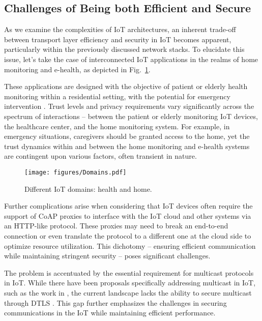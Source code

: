 \documentclass{ieeeaccess}
\begin{document}
\subsection{Challenges of Being both Efficient and Secure}

As we examine the complexities of IoT architectures, an inherent trade-off between transport layer efficiency and security in IoT becomes apparent, particularly within the previously discussed network stacks. To elucidate this issue, let's take the case of interconnected IoT applications in the realms of home monitoring and e-health, as depicted in Fig.~\ref{fig:domains}.

These applications are designed with the objective of patient or elderly health monitoring within a residential setting, with the potential for emergency intervention \cite{liu2016smart}. Trust levels and privacy requirements vary significantly across the spectrum of interactions -- between the patient or elderly monitoring IoT devices, the healthcare center, and the home monitoring system. For example, in emergency situations, caregivers should be granted access to the home, yet the trust dynamics within and between the home monitoring and e-health systems are contingent upon various factors, often transient in nature.


\begin{figure}
	\centering
	\texttt{[image: figures/Domains.pdf]}
	\caption{Different IoT domains: health and home.}
	\label{fig:domains}
\end{figure}

Further complications arise when considering that IoT devices often require the support of CoAP proxies to interface with the IoT cloud and other systems via an HTTP-like protocol. These proxies may need to break an end-to-end connection or even translate the protocol to a different one at the cloud side to optimize resource utilization. This dichotomy -- ensuring efficient communication while maintaining stringent security -- poses significant challenges.

The problem is accentuated by the essential requirement for multicast protocols in IoT. While there have been proposals specifically addressing multicast in IoT, such as the work in \cite{huang2016multicast}, the current landscape lacks the ability to secure multicast through DTLS \cite{grammatikis2019securing}. This gap further emphasizes the challenges in securing communications in the IoT while maintaining efficient performance.
\end{document}
